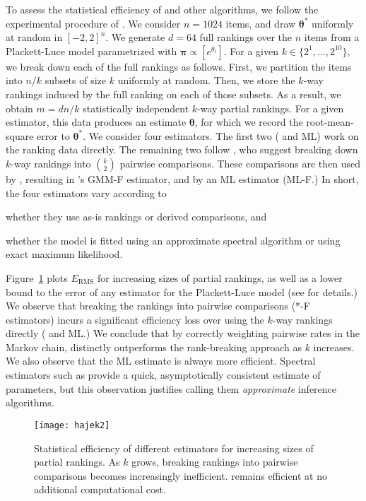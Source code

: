 To assess the statistical efficiency of \LSR{} and other algorithms, we follow the experimental procedure of \citet{hajek2014minimax}.
We consider $n = 1024$ items, and draw $\bm{\theta}^*$ uniformly at random in $[-2, 2]^n$.
We generate $d = 64$ full rankings over the $n$ items from a Plackett-Luce model parametrized with $\bm{\pi} \propto [e^{\theta_i}]$.
For a given $k \in \{2^1, \ldots, 2^{10}\}$, we break down each of the full rankings as follows.
First, we partition the items into $n/k$ subsets of size $k$ uniformly at random.
Then, we store the $k$-way rankings induced by the full ranking on each of those subsets.
As a result, we obtain $m = dn/k$ statistically independent $k$-way partial rankings.
For a given estimator, this data produces an estimate $\bm{\theta}$, for which we record the root-mean-square error to $\bm{\theta}^*$.
We consider four estimators.
The first two (\LSR{} and ML) work on the ranking data directly.
The remaining two follow \citet{azari2013generalized}, who suggest breaking down $k$-way rankings into $\binom{k}{2}$ pairwise comparisons.
These comparisons are then used by \LSR{}, resulting in \citeauthor{azari2013generalized}'s GMM-F estimator, and by an ML estimator (ML-F.)
In short, the four estimators vary according to
\begin{enuminline}
\item whether they use as-is rankings or derived comparisons, and
\item whether the model is fitted using an approximate spectral algorithm or using exact maximum likelihood.
\end{enuminline}
Figure~\ref{fig:efficiency} plots $E_{\text{RMS}}$ for increasing sizes of partial rankings, as well as a lower bound to the error of any estimator for the Plackett-Luce model (see \citet{hajek2014minimax} for details.)
We observe that breaking the rankings into pairwise comparisons (*-F estimators) incurs a significant efficiency loss over using the $k$-way rankings directly (\LSR{} and ML.)
We conclude that by correctly weighting pairwise rates in the Markov chain, \LSR{} distinctly outperforms the rank-breaking approach as $k$ increases.
We also observe that the ML estimate is always more efficient.
Spectral estimators such as \LSR{} provide a quick, asymptotically consistent estimate of parameters, but this observation justifies calling them \emph{approximate} inference algorithms.


\begin{figure}[ht]
\centering
\texttt{[image: hajek2]}
\vskip -0.1in
\caption{
Statistical efficiency of different estimators for increasing sizes of partial rankings.
As $k$ grows, breaking rankings into pairwise comparisons becomes increasingly inefficient.
\LSR{} remains efficient at no additional computational cost.
}
\vskip -0.1in
\label{fig:efficiency}
\end{figure}


